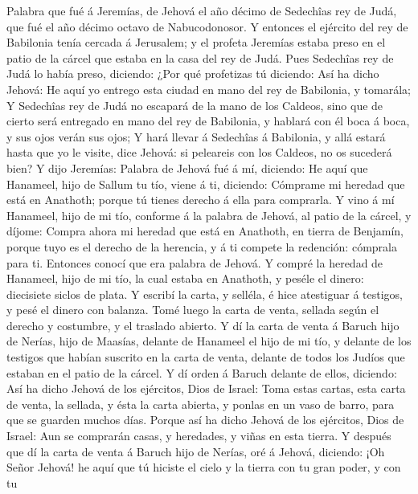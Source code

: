  Palabra que fué á Jeremías, de Jehová el año décimo de
Sedechîas rey de Judá, que fué el año décimo octavo de Nabucodonosor.
 Y entonces el ejército del rey de Babilonia tenía cercada
á Jerusalem; y el profeta Jeremías estaba preso en el patio de la cárcel
que estaba en la casa del rey de Judá.  Pues Sedechîas rey
de Judá lo había preso, diciendo: ¿Por qué profetizas tú diciendo: Así
ha dicho Jehová: He aquí yo entrego esta ciudad en mano del rey de
Babilonia, y tomarála;  Y Sedechîas rey de Judá no
escapará de la mano de los Caldeos, sino que de cierto será entregado en
mano del rey de Babilonia, y hablará con él boca á boca, y sus ojos
verán sus ojos;  Y hará llevar á Sedechîas á Babilonia, y
allá estará hasta que yo le visite, dice Jehová: si peleareis con los
Caldeos, no os sucederá bien?  Y dijo Jeremías: Palabra de
Jehová fué á mí, diciendo:  He aquí que Hanameel, hijo de
Sallum tu tío, viene á ti, diciendo: Cómprame mi heredad que está en
Anathoth; porque tú tienes derecho á ella para comprarla. 
Y vino á mí Hanameel, hijo de mi tío, conforme á la palabra de Jehová,
al patio de la cárcel, y díjome: Compra ahora mi heredad que está en
Anathoth, en tierra de Benjamín, porque tuyo es el derecho de la
herencia, y á ti compete la redención: cómprala para ti. Entonces conocí
que era palabra de Jehová.  Y compré la heredad de
Hanameel, hijo de mi tío, la cual estaba en Anathoth, y peséle el
dinero: diecisiete siclos de plata.  Y escribí la carta,
y selléla, é hice atestiguar á testigos, y pesé el dinero con balanza.
 Tomé luego la carta de venta, sellada según el derecho y
costumbre, y el traslado abierto.  Y dí la carta de venta
á Baruch hijo de Nerías, hijo de Maasías, delante de Hanameel el hijo de
mi tío, y delante de los testigos que habían suscrito en la carta de
venta, delante de todos los Judíos que estaban en el patio de la cárcel.
 Y dí orden á Baruch delante de ellos, diciendo:
 Así ha dicho Jehová de los ejércitos, Dios de Israel:
Toma estas cartas, esta carta de venta, la sellada, y ésta la carta
abierta, y ponlas en un vaso de barro, para que se guarden muchos días.
 Porque así ha dicho Jehová de los ejércitos, Dios de
Israel: Aun se comprarán casas, y heredades, y viñas en esta tierra.
 Y después que dí la carta de venta á Baruch hijo de
Nerías, oré á Jehová, diciendo:  ¡Oh Señor Jehová! he
aquí que tú hiciste el cielo y la tierra con tu gran poder, y con tu
